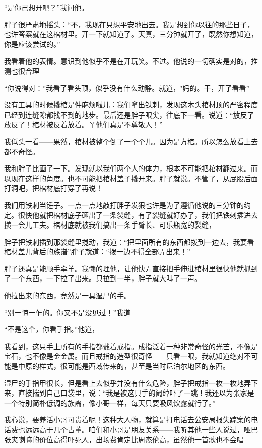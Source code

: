 “是你己想开吧？”我问他。

胖子很严肃地摇头：“不，我现在只想平安地出去。我是想到你以往的那些日子，也许答案就在这棺材里。开一下就知道了。天真，三分钟就开了，既然你想知道，你是应该尝试的。”

我看着他的表情。意识到他似乎不是在开玩笑。不过。他说的一切确实是对的，推测也很合理

“你说得对：”我看了看头顶，似乎没有什么动静。就道，"妈的。干，开了看看”

没有工具的时候撬棺是件麻烦啦儿：我们拿出铁刺，发现这木头棺材顶的严密程度已经到连缝隙都找不到的地步。最后还是胖子眼尖，往底下一看。说道：“放反了放反了！棺材被反着放着。丫他们真是不尊敬人！”

我低头一看——果然，棺材被整个倒了一个个儿。因为是方棺。所以怎么放看上去都不奇怪。

我和胖子比画了一下。发现就以我们两个人的体力，根本不可能把棺材翻过来。而以现在这样的角度。也不可能把棺材盖子撬开来。胖子就说。不管了，从屁股后面打洞吧，把棺材底打穿了再说！

我们用铁刺当锤子。一点一点地敲打胖子发狠也许是为了遵循他说的三分钟的约定。很快他就把棺材底子砸出了一条裂缝，有了裂缝就好办了，我们把铁刺插进去撗一会儿工夫。棺材底就被我们搞出一条手臂长、可乐瓶宽的裂缝，

胖子把铁刺插到那裂缝里搅动，我道：“把里面所有的东西都拨到一边去，我要看棺材盖儿背后的族谱”胖子就道：“拨一边不得全部弄出来！”

胖子还真是能顺手牵羊。我懒的理他，让他快弄直接把手伸进棺材里很快他就抓到了一个东西，一下拉了出来。只拉到一半，胖子就大叫了一声。

他拉出来的东西，竞然是一具湿尸的手。

“别一惊一乍的。你又不是没见过！”我道

“不是这个，你看手指。”他道，

我看到，这只手上所有的手指都戴着戒指。成指泛着一种非常奇怪的光芒，不像是宝石，也不像是金金属。而且戒指的造型很奇怪——只看一眼，我就知道绝对不可能是中原的样式，很可能是西域传来的，甚至是当时尼泊尔地区的东西。

湿尸的手指甲很长，但是看上去似乎并没有什么危险，胖子把戒指一枚一枚地弄下来，直接揣到自己口袋里，说：“我是被这只手的阏绰吓了一跳！我还以为张家是一个特别简朴低调的族裔，像小哥一样，每天只要吸风饮露就行了。”

我心说，要养活小哥可贵着呢！这种大人物，就算是打电话去公安局报失踪案的电话费也远远高于几个古董。咱们和小哥是朋友关系——我听其他一些人说过，哑巴张夹喇嘛的价位高得吓死人，出场费肯定比周杰伦高，虽然他一首歌也不会唱

